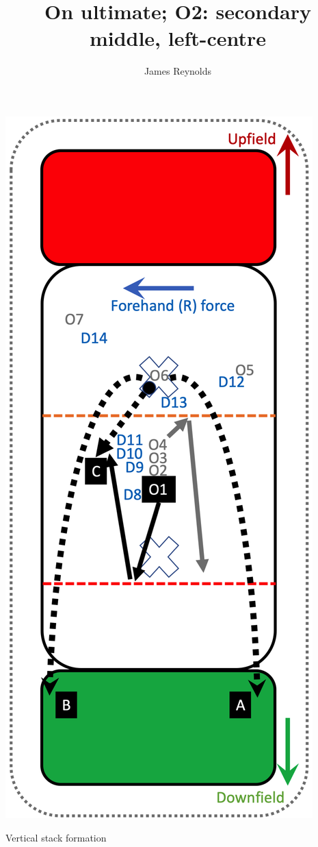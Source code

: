\documentclass{tufte-handout}
\title{On ultimate; O2: secondary middle, left-centre}
\author[James Reynolds]{James Reynolds}
\begin{document}
\maketitle%


\begin{marginfigure}%
  \includegraphics[width=\linewidth]{O1-vertical}
  \caption{Vertical stack formation}
  \label{fig:O1-vertical}
\end{marginfigure}
\end{document}
